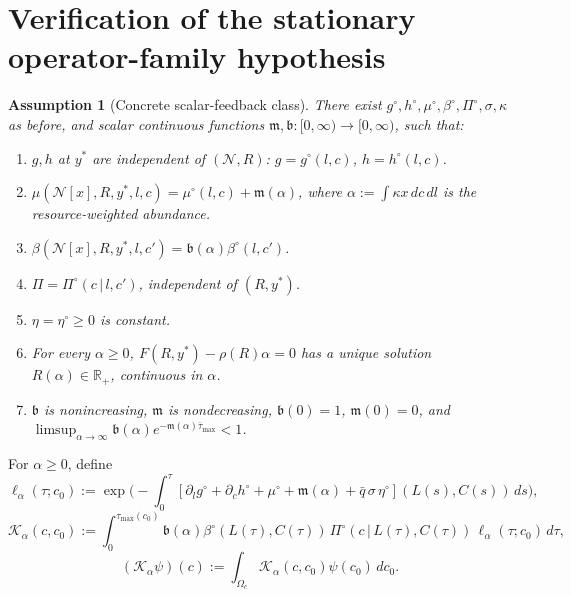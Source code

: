 \documentclass[pdflatex,sn-mathphys-num]{sn-jnl}%
\newtheorem{assumption}[theorem]{Assumption}
\begin{document}
\section{Verification of the stationary operator-family hypothesis}%
\label{app:stationary_family}
\begin{assumption}[Concrete scalar-feedback class]\label{ass:appD_concrete}
There exist \(g^\circ,h^\circ,\mu^\circ,\beta^\circ,\Pi^\circ,\sigma,\kappa\) as before,
and scalar continuous functions
\(\mathfrak m,\mathfrak b:[0,\infty)\to[0,\infty)\),
such that:
\begin{enumerate}[label=\textup{(C\arabic*)}]
\item \(g,h\) at \(y^\ast\) are independent of \((\mathcal N,R)\):
\(g=g^\circ(l,c)\), \(h=h^\circ(l,c)\).
\item
\(\mu(\mathcal N[x],R,y^\ast,l,c)=\mu^\circ(l,c)+\mathfrak m(\alpha)\),
where \(\alpha:=\int\kappa x\,dc\,dl\) is the resource-weighted abundance.
\item
\(\beta(\mathcal N[x],R,y^\ast,l,c')=\mathfrak b(\alpha)\beta^\circ(l,c')\).
\item
\(\Pi=\Pi^\circ(c\,|\,l,c')\), independent of \((R,y^\ast)\).
\item
\(\eta=\eta^\circ\ge 0\) is constant.
\item
For every \(\alpha\ge 0\),
\(F(R,y^\ast)-\rho(R)\alpha=0\) has a unique solution
\(R(\alpha)\in\mathbb R_+\), continuous in \(\alpha\).
\item
\(\mathfrak b\) is nonincreasing, \(\mathfrak m\) is nondecreasing,
\(\mathfrak b(0)=1\), \(\mathfrak m(0)=0\), and
\(\limsup_{\alpha\to\infty}\mathfrak b(\alpha)e^{-\mathfrak m(\alpha)\overline\tau_{\max}}<1\).
\end{enumerate}
\end{assumption}

For \(\alpha\ge 0\), define
\begin{equation}\label{eq:appD_survival_alpha}
\ell_\alpha(\tau;c_0)
:=
\exp\!\Big(
-\int_0^\tau
[\partial_l g^\circ+\partial_c h^\circ+\mu^\circ+\mathfrak m(\alpha)
+\bar q\,\sigma\,\eta^\circ](L(s),C(s))\,ds
\Big),
\end{equation}
\begin{equation}\label{eq:appD_kernel_alpha}
\mathscr K_\alpha(c,c_0)
:=
\int_0^{\tau_{\max}(c_0)}
\mathfrak b(\alpha)\beta^\circ(L(\tau),C(\tau))\,
\Pi^\circ(c\,|\,L(\tau),C(\tau))\,
\ell_\alpha(\tau;c_0)\,d\tau,
\end{equation}
\[
(\mathcal K_\alpha\psi)(c):=\int_{\Omega_c}\mathscr K_\alpha(c,c_0)\psi(c_0)\,dc_0.
\]
\end{document}

